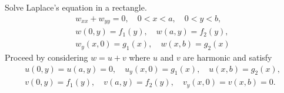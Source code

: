 {%
\begin{Exercise}
Solve Laplace's equation in a rectangle.
\begin{gather*}
  w_{x x} + w_{y y} = 0, \quad 0 < x < a, \quad 0 < y < b, 
  \\
  w(0, y) = f_1(y), \quad w(a, y) = f_2(y), 
  \\
  w_y(x, 0) = g_1(x), \quad w(x, b) = g_2(x)
\end{gather*}
Proceed by considering $w = u + v$ where $u$ and $v$ are harmonic and 
satisfy
\begin{gather*}
  u(0, y) = u(a, y) = 0, \quad u_y(x, 0) = g_1(x), \quad u(x, b) = g_2(x), 
  \\
  v(0, y) = f_1(y), \quad v(a, y) = f_2(y), \quad v_y(x, 0) = v(x, b) = 0.
\end{gather*}
\end{Exercise}








\raggedbottom
}
